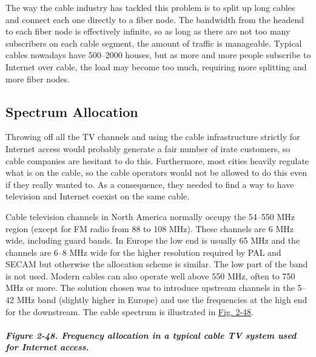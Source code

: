 \documentclass[b5paper,11pt]{memoir}
\begin{document}
The way the cable industry has tackled this problem is to split up long
cables and connect each one directly to a fiber node. The bandwidth from
the headend to each fiber node is effectively infinite, so as long as
there are not too many subscribers on each cable segment, the amount of
traffic is manageable. Typical cables nowadays have 500--2000 houses,
but as more and more people subscribe to Internet over cable, the load
may become too much, requiring more splitting and more fiber nodes.

\protect\hypertarget{0130661023_ch02lev1sec7.htmlux5cux23ch02lev2sec27}{}{}

\subsection{Spectrum Allocation}

Throwing off all the TV channels and using the cable infrastructure
strictly for Internet access would probably generate a fair number of
irate customers, so cable companies are hesitant to do this.
Furthermore, most cities heavily regulate what is on the cable, so the
cable operators would not be allowed to do this even if they really
wanted to. As a consequence, they needed to find a way to have
television and Internet coexist on the same cable.

Cable television channels in North America normally occupy the 54--550
MHz region (except for FM radio from 88 to 108 MHz). These channels are
6 MHz wide, including guard bands. In Europe the low end is usually 65
MHz and the channels are 6--8 MHz wide for the higher resolution
required by PAL and SECAM but otherwise the allocation scheme is
similar. The low part of the band is not used. Modern cables can also
operate well above 550 MHz, often to 750 MHz or more. The solution
chosen was to introduce upstream channels in the 5--42 MHz band
(slightly higher in Europe) and use the frequencies at the high end for
the downstream. The cable spectrum is illustrated in
\protect\hyperlink{0130661023_ch02lev1sec7.htmlux5cux23ch02fig48}{Fig.
2-48}.

\subparagraph[Figure 2-48. Frequency allocation in a typical cable TV
system used for Internet
access.]{\texorpdfstring{\protect\hypertarget{0130661023_ch02lev1sec7.htmlux5cux23ch02fig48}{}{}Figure
2-48. Frequency allocation in a typical cable TV system used for
Internet
access.}{Figure 2-48. Frequency allocation in a typical cable TV system used for Internet access.}}

\end{document}
